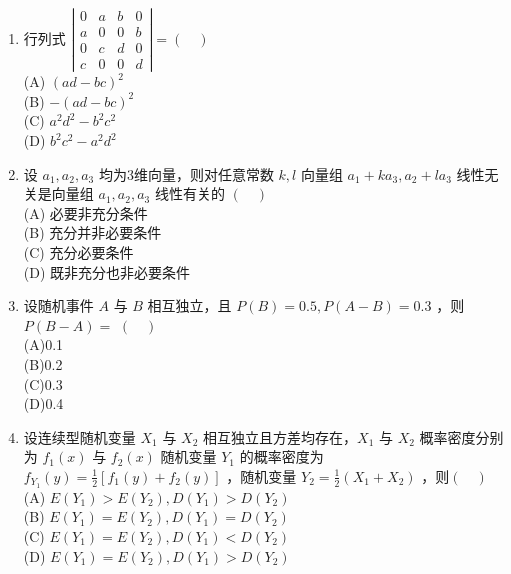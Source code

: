 \begin{enumerate}
\item 行列式 $ \left|\begin{array}{llll}0 & a & b & 0 \\ a & 0 & 0 & b \\ 0 & c & d & 0 \\ c & 0 & 0 & d\end{array}\right|=(\quad)$\\
(A) $(ad-bc)^2$\\
(B) $-(ad-bc)^2$\\
(C) $a^2d^2-b^2c^2$\\
(D) $b^2c^2-a^2d^2$
\item 设 $a_1,a_2,a_3$ 均为3维向量，则对任意常数 $k,l$ 向量组 $a_1+ka_3,a_2+la_3$ 线性无关是向量组 $a_1,a_2,a_3$ 线性有关的 $(\quad)$\\
(A) 必要非充分条件\\
(B) 充分并非必要条件\\
(C) 充分必要条件\\
(D) 既非充分也非必要条件
\item 设随机事件 $A$ 与 $B$ 相互独立，且 $P(B)=0.5,P(A-B)=0.3$ ，则$P(B-A)=$ $(\quad)$\\
(A)0.1\\
(B)0.2\\
(C)0.3\\
(D)0.4
\item 设连续型随机变量 $X_1$ 与 $X_2$ 相互独立且方差均存在，$X_1$  与 $X_2$ 概率密度分别为 $f_1(x)$ 与 $f_2(x)$ 随机变量 $Y_1$ 的概率密度为 $f_{Y_1}(y)=\frac{1}{2}[f_1(y)+f_2(y)]$ ，随机变量 $Y_2=\frac{1}{2}(X_1+X_2)$ ，则$(\quad)$\\
(A) $E(Y_1)>E(Y_2),D(Y_1)>D(Y_2)$\\
(B) $E(Y_1)=E(Y_2),D(Y_1)=D(Y_2)$\\
(C) $E(Y_1)=E(Y_2),D(Y_1)<D(Y_2)$\\
(D) $E(Y_1)=E(Y_2),D(Y_1)>D(Y_2)$

\end{enumerate}
